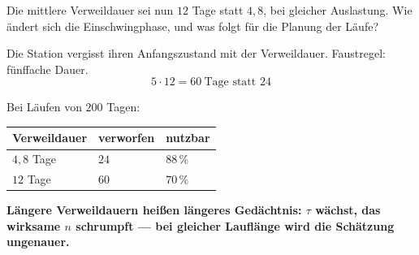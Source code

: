 \begin{aufgabe}
Die mittlere Verweildauer sei nun $12$ Tage statt $4{,}8$, bei gleicher Auslastung. Wie ändert sich die Einschwingphase, und was folgt für die Planung der Läufe?

\loesung
{}
Die Station vergisst ihren Anfangszustand mit der Verweildauer. Faustregel: fünffache Dauer.
\[ 5\cdot12 = 60 \ \text{Tage statt } 24 \]

Bei Läufen von $200$ Tagen:
\begin{center}
{\small
\renewcommand{\arraystretch}{1.48}
\begin{tabular}{@{}P{2.6cm}P{2.4cm}P{2.6cm}@{}}
\toprule
\textbf{Verweildauer} & \textbf{verworfen} & \textbf{nutzbar}\\
\midrule
$4{,}8$ Tage & $24$ & $88\,\%$\\
$12$ Tage & $60$ & $70\,\%$\\
\bottomrule
\end{tabular}}
\end{center}

\begin{center}
\begin{minipage}{0.9\textwidth}
\textbf{Längere Verweildauern heißen längeres Gedächtnis: $\tau$ wächst, das wirksame $n$ schrumpft --- bei gleicher Lauflänge wird die Schätzung ungenauer.}
\end{minipage}
\end{center}

\begin{center}
\begin{minipage}{0.88\textwidth}
\end{minipage}
\end{center}
\end{aufgabe}

